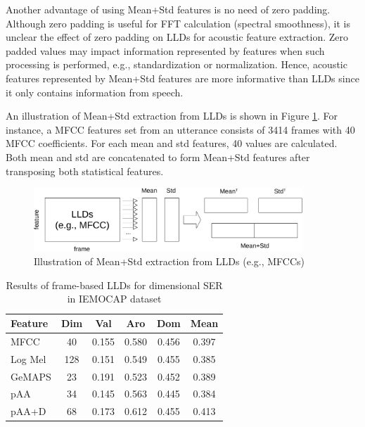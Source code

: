 Another advantage of using Mean+Std features is no need of zero padding.
Although zero padding is useful for FFT calculation (spectral smoothness), it
is unclear the effect of zero padding on LLDs for acoustic feature extraction.
Zero padded values may impact information represented by features when such
processing is performed, e.g., standardization or normalization. Hence,
acoustic features represented by Mean+Std features are more informative than
LLDs since it only contains information from speech. 

An illustration of Mean+Std extraction from LLDs is shown in Figure
\ref{fig:mean_std}. For instance, a MFCC features set from an utterance
consists of 3414 frames with 40 MFCC coefficients. For each mean and std
features, 40 values are calculated. Both mean and std are concatenated to form
Mean+Std features after transposing both statistical features.

\begin{figure}[htbp]
  \centering
  \includegraphics[width=0.9\textwidth]{../fig/mean_std-crop.pdf}
  \caption{Illustration of Mean+Std extraction from LLDs (e.g., MFCCs)}
  \label{fig:mean_std}
\end{figure}


\begin{table}
    \caption{Results of frame-based LLDs for dimensional SER in IEMOCAP dataset}
    \begin{center}
    \begin{tabular}{l | c | c c c c}
      \hline
      Feature & Dim & Val & Aro & Dom & Mean \\
      \hline \hline
      MFCC      & 	40	& 0.155	& 0.580	  & 0.456 &	0.397 \\
      Log Mel	  &   128	& 0.151	& 0.549	  & 0.455 &	0.385 \\
      GeMAPS    & 	23	& 0.191	& 0.523	  & 0.452 &	0.389 \\
      pAA       & 	34	& 0.145	& 0.563	  & 0.445 &	0.384 \\
      pAA+D     & 	68	& 0.173	& 0.612	  & 0.455 &	0.413 \\
      \hline
    \end{tabular}
    \label{tab:iemocap-hsf}
  \end{center}
\end{table}

